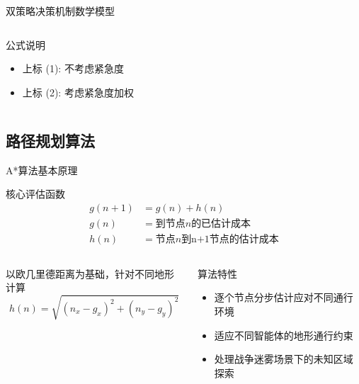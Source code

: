 \documentclass[
10pt,
aspectratio=169,
]{beamer}
\begin{document}
\begin{frame}{双策略决策机制数学模型}
\begin{columns}[T]
\begin{column}{0.48\textwidth}
            
            \begin{block}{公式说明}
                \begin{itemize}
                    \item 上标 (1): 不考虑紧急度
                    \item 上标 (2): 考虑紧急度加权

                \end{itemize}
            \end{block}
        \end{column}
    \end{columns}
    
    
\end{frame}



\subsection{路径规划算法}
\begin{frame}{A*算法基本原理}
    \begin{alertblock}{核心评估函数}
        \begin{align}
            g(n+1) &= g(n) + h(n) \\
            g(n) &= \text{到节点}n\text{的已估计成本} \\
            h(n) &= \text{节点}n\text{到n+1节点的估计成本}
        \end{align}
    \end{alertblock}
    
    \begin{columns}
        \begin{column}{0.5\textwidth}
            \begin{exampleblock}{以欧几里德距离为基础，针对不同地形计算}
                \begin{equation}
                    h(n) = \sqrt{(n_x - g_x)^2 + (n_y - g_y)^2}
                \end{equation}
                
                
            \end{exampleblock}
        \end{column}
        \begin{column}{0.5\textwidth}
            \begin{alertblock}{算法特性}
                \begin{itemize}
                    \item 逐个节点分步估计应对不同通行环境
\item 适应不同智能体的地形通行约束 
\item 处理战争迷雾场景下的未知区域探索
                \end{itemize}
            \end{alertblock}
        \end{column}
    \end{columns}
\end{frame}
\end{document}
